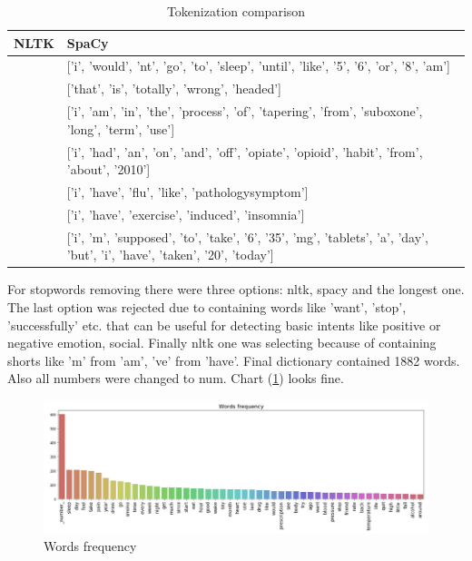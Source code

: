 \documentclass[11pt]{article}
\begin{document}
\begin{center}
\begin{table}
\begin{tabular}{ |p{7cm}|p{7cm}| }
\hline
NLTK & SpaCy \\ \hline
['i', 'wouldnt', 'go', 'to', 'sleep', 'until', 'like', '5', '6', 'or', '8am'] & 
['i', 'would', 'nt', 'go', 'to', 'sleep', 'until', 'like', '5', '6', 'or', '8', 'am'] \\ \hline
['that', 'is', 'totally', 'wrongheaded'] & ['that', 'is', 'totally', 'wrong', 'headed'] \\ \hline
['i', 'am', 'in', 'the', 'process', 'of', 'tapering', 'from', 'suboxone', 'longterm', 'use'] & 
['i', 'am', 'in', 'the', 'process', 'of', 'tapering', 'from', 'suboxone', 'long', 'term', 'use'] \\ \hline
['i', 'had', 'an', 'onandoff', 'opiateopioid', 'habit', 'from', 'about', '2010'] & 
['i', 'had', 'an', 'on', 'and', 'off', 'opiate', 'opioid', 'habit', 'from', 'about', '2010'] \\ 
\hline
['i', 'have', 'flulike', 'pathologysymptom'] & ['i', 'have', 'flu', 'like', 'pathologysymptom'] \\ \hline
['i', 'have', 'exerciseinduced', 'insomnia'] & ['i', 'have', 'exercise', 'induced', 'insomnia'] \\ \hline
['i', 'm', 'supposed', 'to', 'take', '6', '35mg', 'tablets', 'a', 'day', 'but', 'i', 'have', 'taken', '20', 'today'] & 
['i', 'm', 'supposed', 'to', 'take', '6', '35', 'mg', 'tablets', 'a', 'day', 'but', 'i', 'have', 'taken', '20', 'today'] \\ 
\hline
\end{tabular}	
\caption{Tokenization comparison}\label{token_dif}
\end{table}
\end{center}
\FloatBarrier

For stopwords removing there were three options: nltk, spacy and the longest one. The last option was rejected due to containing words like 'want', 'stop', 'successfully' etc. that can be useful for detecting basic intents like positive or negative emotion, social. Finally nltk one was selecting because of containing shorts like 'm' from 'am', 've' from 'have'. Final dictionary contained 1882 words. Also all numbers were changed to num. Chart (\ref{words_freq}) looks fine.

 \begin{figure}[h]
 	\centering
 	\includegraphics[scale=0.4]{report2.png}
	\caption{Words frequency}
 \label{words_freq}
 \end{figure}
\FloatBarrier
\end{document}
